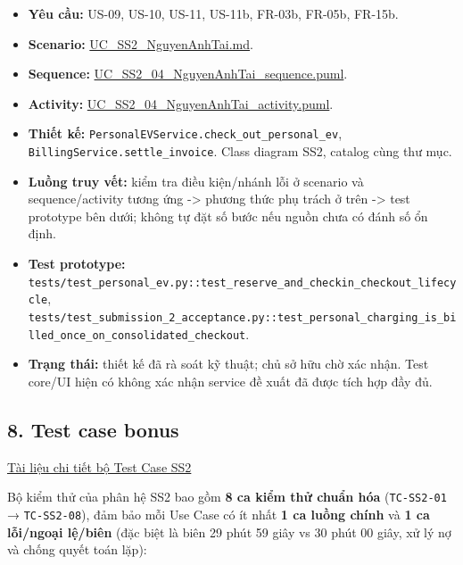 \documentclass[11pt,a4paper]{article}
\providecommand{\tightlist}{%
  \setlength{\itemsep}{0pt}\setlength{\parskip}{0pt}}
\begin{document}
\begin{itemize}
\tightlist
\item
  \textbf{Yêu cầu:} US-09, US-10, US-11, US-11b, FR-03b, FR-05b, FR-15b.
\item
  \textbf{Scenario:}
  \href{../../../../docs/diagrams/Use-case\%20detail-scenario/SS2/Usecase\%20scenario/UC_SS2_NguyenAnhTai.md}{UC\_SS2\_NguyenAnhTai.md}.
\item
  \textbf{Sequence:}
  \href{../../../../docs/diagrams/Use-case\%20detail-scenario/SS2/Sequence\%20diagrams/UC_SS2_04_NguyenAnhTai_sequence.puml}{UC\_SS2\_04\_NguyenAnhTai\_sequence.puml}.
\item
  \textbf{Activity:}
  \href{../../../../docs/diagrams/Use-case\%20detail-scenario/SS2/Activity\%20diagrams/UC_SS2_04_NguyenAnhTai_activity.puml}{UC\_SS2\_04\_NguyenAnhTai\_activity.puml}.
\item
  \textbf{Thiết kế:}
  \texttt{PersonalEVService.check\_out\_personal\_ev},
  \texttt{BillingService.settle\_invoice}. Class diagram SS2, catalog
  cùng thư mục.
\item
  \textbf{Luồng truy vết:} kiểm tra điều kiện/nhánh lỗi ở scenario và
  sequence/activity tương ứng -\textgreater{} phương thức phụ trách ở
  trên -\textgreater{} test prototype bên dưới; không tự đặt số bước nếu
  nguồn chưa có đánh số ổn định.
\item
  \textbf{Test prototype:}
  \texttt{tests/test\_personal\_ev.py::test\_reserve\_and\_checkin\_checkout\_lifecycle},
  \texttt{tests/test\_submission\_2\_acceptance.py::test\_personal\_charging\_is\_billed\_once\_on\_consolidated\_checkout}.
\item
  \textbf{Trạng thái:} thiết kế đã rà soát kỹ thuật; chủ sở hữu chờ xác
  nhận. Test core/UI hiện có không xác nhận service đề xuất đã được tích
  hợp đầy đủ.
\end{itemize}

\hypertarget{test-case-bonus}{%
\subsection{8. Test case bonus}\label{test-case-bonus}}

\href{test_cases.md}{Tài liệu chi tiết bộ Test Case SS2}

Bộ kiểm thử của phân hệ SS2 bao gồm \textbf{8 ca kiểm thử chuẩn hóa}
(\texttt{TC-SS2-01} → \texttt{TC-SS2-08}), đảm bảo mỗi Use Case có ít
nhất \textbf{1 ca luồng chính} và \textbf{1 ca lỗi/ngoại lệ/biên} (đặc
biệt là biên 29 phút 59 giây vs 30 phút 00 giây, xử lý nợ và chống quyết
toán lặp):
\end{document}
